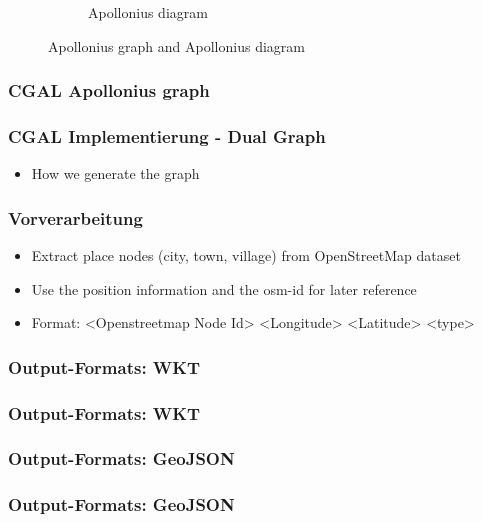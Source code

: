 \documentclass{beamer}
\begin{document}
\begin{frame}
\begin{figure}[htp]
\begin{subfigure}[b]{0.48\textwidth}
                    \caption{Apollonius diagram}
                    \label{fig:apo-diagram}
            \end{subfigure}
            \caption{Apollonius graph and Apollonius diagram}\label{fig:apollonius}
    \end{figure}
\end{frame}


\begin{frame}
    \frametitle{CGAL Apollonius graph}
    
\end{frame}

\begin{frame}
    \frametitle{CGAL Implementierung - Dual Graph}
    \begin{itemize}
        \item How we generate the graph
    \end{itemize}
\end{frame}

\begin{frame}
    \frametitle{Vorverarbeitung}
    \begin{itemize}
        \item Extract place nodes (city, town, village) from OpenStreetMap dataset 
        \item Use the position information and the osm-id for later reference
        \item Format: <Openstreetmap Node Id> <Longitude> <Latitude> <type>
    \end{itemize}
\end{frame}

\begin{frame}
    \frametitle{Output-Formats: WKT}
    
\end{frame}

\begin{frame}
    \frametitle{Output-Formats: WKT}
    
\end{frame}

\begin{frame}
    \frametitle{Output-Formats: GeoJSON}
    
\end{frame}

\begin{frame}
    \frametitle{Output-Formats: GeoJSON}
    
\end{frame}
\end{document}
